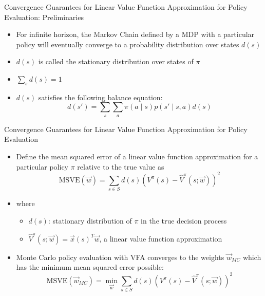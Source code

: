 \begin{frame}[c]{Convergence Guarantees for Linear Value Function	Approximation for Policy Evaluation: Preliminaries}
	
	\begin{itemize}
		\item For infinite horizon, the Markov Chain defined by a MDP with a particular policy will eventually converge to a probability distribution over states $d(s)$
		\item $d(s)$ is called the stationary distribution over states of $\pi$
		\item $\sum_{s} d(s) = 1$
		\item $d(s)$ satisfies the following balance equation:
		$$ d(s') = \sum_{s} \sum_{a} \pi(a \mid s) p(s' \mid s,a) d(s) $$
	\end{itemize}
	
\end{frame}
\begin{frame}[c]{Convergence Guarantees for Linear Value Function
		Approximation for Policy Evaluation }
	
	\begin{itemize}
		\item Define the mean squared error of a linear value function approximation for a particular policy $\pi$  relative to the true value as 
		$$\text{MSVE}(\vec{w}) = \sum_{s \in S} d(s) (V^\pi (s) - \hat{V}^\pi(s;\vec{w}))^2 $$
		\item where
		\begin{itemize}
			\item $d(s)$: stationary distribution of $\pi$ in the true decision process
			\item $\hat{V}^\pi(s;\vec{w}) = \vec{x}(s)^T\vec{w}$, a linear value function approximation
		\end{itemize}
		\item Monte Carlo policy evaluation with VFA converges to the weights $\vec{w}_{MC}$ which has the minimum mean squared error possible:
		$$\text{MSVE}(\vec{w}_{MC}) = \min_{\vec{w}}\sum_{s \in S} d(s) (V^\pi (s) - \hat{V}^\pi(s;\vec{w}))^2 $$
	\end{itemize}
	
\end{frame}

